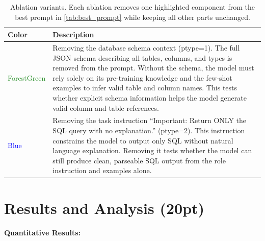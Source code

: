 \documentclass{article}
\begin{document}
\begin{table}[h!]
\centering
\begin{tabular}{p{2cm}p{10cm}}
\toprule
\textbf{Color} & \textbf{Description} \\
\midrule
\textcolor{ForestGreen}{ForestGreen} & Removing the database schema context (ptype=1). The full JSON schema describing all tables, columns, and types is removed from the prompt. Without the schema, the model must rely solely on its pre-training knowledge and the few-shot examples to infer valid table and column names. This tests whether explicit schema information helps the model generate valid column and table references. \\
\midrule
\textcolor{Blue}{Blue} & Removing the task instruction ``Important: Return ONLY the SQL query with no explanation.'' (ptype=2). This instruction constrains the model to output only SQL without natural language explanation. Removing it tests whether the model can still produce clean, parseable SQL output from the role instruction and examples alone. \\
\bottomrule
\end{tabular}
\caption{Ablation variants. Each ablation removes one highlighted component from the best prompt in \autoref{tab:best_prompt} while keeping all other parts unchanged.}
\label{tab:ablation_explanation}
\end{table}



\newpage



\section{Results and Analysis (20pt)}

\paragraph{Quantitative Results:}
\end{document}
